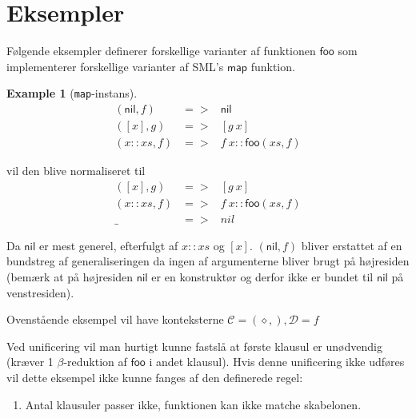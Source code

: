 \documentclass[oneside]{memoir}
\theoremstyle{definition}
\newtheorem{example}{Example}
\begin{document}
\section{Eksempler}

Følgende eksempler definerer forskellige varianter af funktionen $\mathsf{foo}$
som implementerer forskellige varianter af SML's $\mathsf{map}$ funktion.

\begin{example}[\texttt{map}-instans]
  \begin{eqnarray*}
    (\mathsf{nil}, f) &=>& \mathsf{nil} \\
    ([x], g) &=>& [g\ x] \\
    (x::xs, f) &=>& f\ x  :: \mathsf{foo}(xs,f)
  \end{eqnarray*}

  vil den blive normaliseret til
  \begin{eqnarray*}
    ([x], g) &=>& [g\ x] \\
    (x::xs, f) &=>& f\ x  :: \mathsf{foo}(xs,f) \\
    \_ &=>& nil
  \end{eqnarray*}

  Da $\mathsf{nil}$ er mest generel, efterfulgt af $x::xs$ og $[x]$. $(\mathsf{nil}, f)$
  bliver erstattet af en bundstreg af generaliseringen da ingen af argumenterne
  bliver brugt på højresiden (bemærk at på højresiden $\mathsf{nil}$ er en
  konstruktør og derfor ikke er bundet til $\mathsf{nil}$ på venstresiden).

  Ovenstående eksempel vil have konteksterne $\mathcal{C} = (\diamond, ),
  \mathcal{D} = f$

  Ved unificering vil man hurtigt kunne fastslå at første klausul er unødvendig
  (kræver 1 $\beta$-reduktion af $\mathsf{foo}$ i andet klausul). Hvis denne
  unificering ikke udføres vil dette eksempel ikke kunne fanges af den
  definerede regel:

  \begin{enumerate}
  \item Antal klausuler passer ikke, funktionen kan ikke matche skabelonen.
  \end{enumerate}
\end{example}
\end{document}
